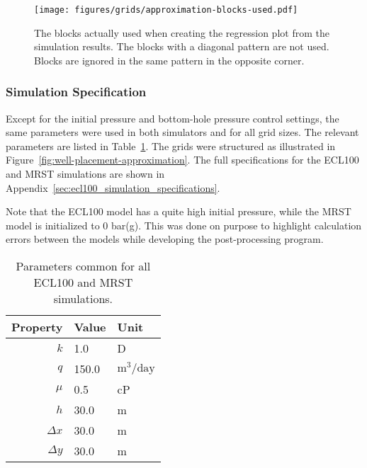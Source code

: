 \begin{figure}[htbp]
    \centering
    \texttt{[image: figures/grids/approximation-blocks-used.pdf]}
    \caption{The blocks actually used when creating the regression plot from the simulation results. The blocks with a diagonal pattern are not used. Blocks are ignored in the same pattern in the opposite corner.}
    \label{fig:blocks-used}
\end{figure}

\subsubsection{Simulation Specification} %
\label{ssub:simulation_specification}
Except for the initial pressure and bottom-hole pressure control settings, the same parameters were used in both simulators and for all grid sizes. The relevant parameters are listed in Table~\ref{tbl:simulation-parameters}. The grids were structured as illustrated in Figure~\ref{fig:well-placement-approximation}. The full specifications for the ECL100 and MRST simulations are shown in Appendix~\ref{sec:ecl100_simulation_specifications}.

Note that the ECL100 model has a quite high initial pressure, while the MRST model is initialized to 0 bar(g). This was done on purpose to highlight calculation errors between the models while developing the post-processing program.

\begin{table}[H]
    \caption{Parameters common for all ECL100 and MRST simulations.}
    \centering
    \begin{tabular}{rll}
        \toprule
        Property & Value & Unit \\
        \midrule
        $k$        & 1.0   & D                           \\
        $q$        & 150.0 & $\mathrm{m}^3/\mathrm{day}$ \\
        $\mu$      & 0.5   & cP                          \\
        $h$        & 30.0  & m                           \\
        $\Delta x$ & 30.0  & m                           \\
        $\Delta y$ & 30.0  & m                           \\
        \bottomrule
    \end{tabular}
    \label{tbl:simulation-parameters}
\end{table}

